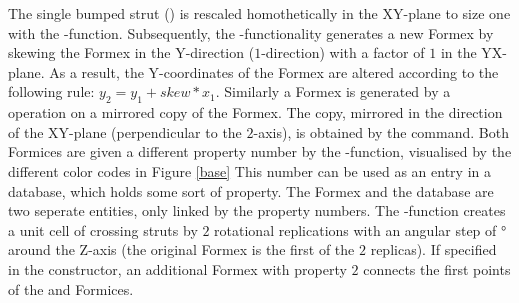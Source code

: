 The single bumped strut () is rescaled homothetically in the XY-plane to size one with the -function. Subsequently, the -functionality generates a new  Formex by skewing the  Formex in the Y-direction ($1$-direction) with a  factor of $1$ in the YX-plane. As a result, the Y-coordinates of the  Formex are altered according to the following rule: $y_2 = y_1 + skew * x_1$. Similarly a  Formex is generated by a  operation on a mirrored copy of the  Formex. The  copy, mirrored in the direction of the XY-plane (perpendicular to the $2$-axis), is obtained by the  command. Both Formices are given a different property number by the -function, visualised by the different color codes in Figure \ref{base} This number can be used as an entry in a database, which holds some sort of property. The Formex and the database are two seperate entities, only linked by the property numbers. The -function creates a unit cell of crossing struts by $2$ rotational replications with an angular step of \unit[180]{°} around the Z-axis (the original Formex is the first of the $2$ replicas). If specified in the constructor, an additional Formex with property $2$ connects the first points of the  and  Formices.
%


